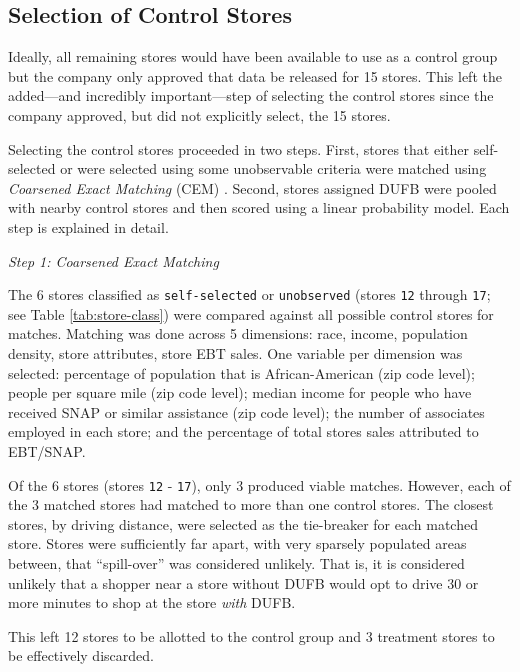 \documentclass[12pt,letterpaperpaper,]{book}
\begin{document}
\subsection*{Selection of Control
Stores}\label{selection-of-control-stores}

Ideally, all remaining stores would have been available to use as a
control group but the company only approved that data be released for 15
stores. This left the added---and incredibly important---step of
selecting the control stores since the company approved, but did not
explicitly select, the 15 stores.

Selecting the control stores proceeded in two steps. First, stores that
either self-selected or were selected using some unobservable criteria
were matched using \emph{Coarsened Exact Matching} (CEM)
\citep{iacus_causal_2011}. Second, stores assigned DUFB were pooled with
nearby control stores and then scored using a linear probability model.
Each step is explained in detail.

\emph{Step 1: Coarsened Exact Matching}

The 6 stores classified as \texttt{self-selected} or \texttt{unobserved}
(stores \texttt{12} through \texttt{17}; see Table
\ref{tab:store-class}) were compared against all possible control stores
for matches. Matching was done across 5 dimensions: race, income,
population density, store attributes, store EBT sales. One variable per
dimension was selected: percentage of population that is
African-American (zip code level); people per square mile (zip code
level); median income for people who have received SNAP or similar
assistance (zip code level); the number of associates employed in each
store; and the percentage of total stores sales attributed to EBT/SNAP.

Of the 6 stores (stores \texttt{12} - \texttt{17}), only 3 produced
viable matches. However, each of the 3 matched stores had matched to
more than one control stores. The closest stores, by driving distance,
were selected as the tie-breaker for each matched store. Stores were
sufficiently far apart, with very sparsely populated areas between, that
``spill-over'' was considered unlikely. That is, it is considered
unlikely that a shopper near a store without DUFB would opt to drive 30
or more minutes to shop at the store \emph{with} DUFB.

This left 12 stores to be allotted to the control group and 3 treatment
stores to be effectively discarded.
\end{document}
